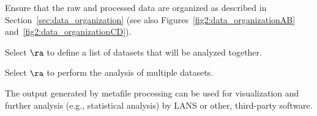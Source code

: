 \s Ensure that the raw and processed data are organized as described in Section~\ref{sec:data_organization} (see also Figures~\ref{fig2:data_organizationAB} and~\ref{fig2:data_organizationCD}).

\s Select  $\ra$  to define a list of datasets that will be analyzed together.


\s Select  $\ra$  to perform the analysis of multiple datasets.

%
\bul
The output generated by metafile processing can be used for visualization and further analysis (e.g., statistical analysis) by LANS or other, third-party software.
